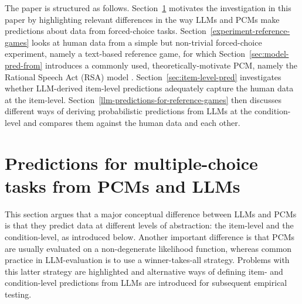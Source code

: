 \documentclass[fleqn]{article}
\begin{document}
The paper is structured as follows.
Section~\ref{motivation} motivates the investigation in this paper by highlighting relevant differences in the way  LLMs and PCMs make predictions about data from forced-choice tasks.
Section~\ref{experiment-reference-games} looks at human data from a simple but non-trivial forced-choice experiment, namely a text-based reference game, for which Section~\ref{sec:model-pred-from} introduces a commonly used, theoretically-motivate PCM, namely the Rational Speech Act (RSA) model \citep{FrankGoodman2012:Predicting-Prag}.
Section~\ref{sec:item-level-pred} investigates whether LLM-derived item-level predictions adequately capture the human data at the item-level.
Section~\ref{llm-predictions-for-reference-games} then discusses different ways of deriving probabilistic predictions from LLMs at the condition-level and compares them against the human data and each other.

\section{Predictions for multiple-choice tasks from PCMs and LLMs}
\label{motivation}

This section argues that a major conceptual difference between LLMs and PCMs is that they predict data at different levels of abstraction: the item-level and the condition-level, as introduced below.
Another important difference is that PCMs are usually evaluated on a non-degenerate likelihood function, whereas common practice in LLM-evaluation is to use a winner-takes-all strategy.
Problems with this latter strategy are highlighted and alternative ways of defining item- and condition-level predictions from LLMs are introduced for subsequent empirical testing.
\end{document}
